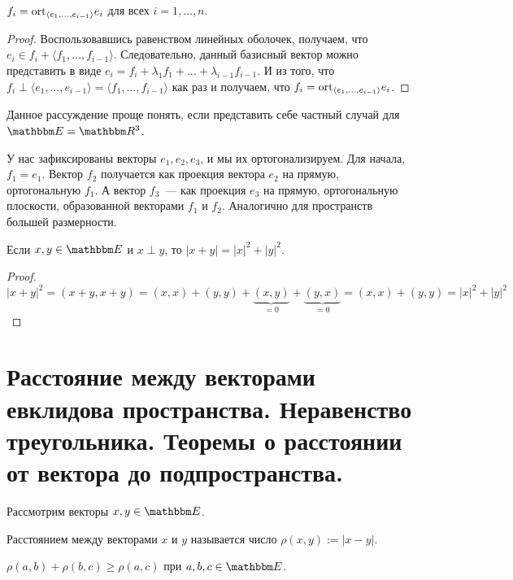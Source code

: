 \begin{Suggestion}
	$f_i = \mathrm{ort}_{\langle e_1, \ldots, e_{i-1}\rangle} e_i$ для всех $i = 1, \ldots, n$.
\end{Suggestion}
\begin{proof}
Воспользовавшись равенством линейных оболочек, получаем, что \\$e_i \in f_i + \langle f_1, \ldots, f_{i-1}\rangle$. Следовательно, данный базисный вектор можно представить в виде $e_i = f_i + \lambda_1f_1 + \ldots + \lambda_{i -1} f_{i -1}$. И из того, что $f_i \perp \langle e_1, \ldots, e_{i -1} \rangle = \langle f_1, \ldots, f_{i - 1}\rangle$ как раз и получаем, что $f_i = \mathrm{ort}_{\langle e_1, \ldots, e_{i-1}\rangle} e_i$.
\end{proof}

\begin{Examples}
Данное рассуждение проще понять, если представить себе частный случай для $\E = \R^3$.

У нас зафиксированы векторы $e_1, e_2, e_3$, и мы их ортогонализируем. Для начала, $f_1 = e_1$. Вектор $f_2$ получается как проекция вектора $e_2$ на прямую, ортогональную $f_1$. А вектор $f_3$~--- как проекция $e_3$ на прямую, ортогональную плоскости, образованной векторами $f_1$ и $f_2$. Аналогично для пространств большей размерности.
\end{Examples}

\begin{Theorem}[Пифагора]
Если $x, y \in \E$ и $x \perp y$, то $|x+y| = |x|^2 + |y|^2$.
\end{Theorem}

\begin{proof}
	$$|x + y|^2 = (x+y, x+y) = (x, x) + (y, y) + \underbrace{(x, y)}_{=0} + \underbrace{(y, x)}_{=0} = (x, x) + (y, y) = |x|^2 + |y|^2$$
\end{proof}

\section{Расстояние между векторами евклидова пространства. Неравенство треугольника. Теоремы о расстоянии от вектора до подпространства.}

Рассмотрим векторы $x, y \in \E$.
\begin{Def}
	Расстоянием между векторами $x$ и $y$ называется число $\rho(x,y) := |x-y|$.
\end{Def}

\begin{Suggestion}
	$\rho(a,b) + \rho(b,c) \geqslant \rho(a,c)$ при $a, b, c \in \E$.
\end{Suggestion}

